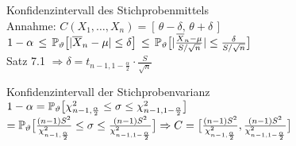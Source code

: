 \begin{example} Konfidenzintervall des Stichprobenmittels \\
	Annahme: \(C(X_1, \ldots, X_n) = [\, \theta - \delta, \, \theta + \delta \,]\) \\
	\(1 - \alpha
	\, \leq \, \P_\theta\big[\abs{\overline{X}_n - \mu} \leq \delta\big]
	\, \leq \, \P_\theta\big[\abs{ \frac{\overline{X}_n - \mu}{S/\sqrt{n}}} \leq \frac{\delta}{S/\sqrt{n}}\big]\) \\
	Satz 7.1 \( \Rightarrow \delta = t_{ n-1 , 1 - \frac{\alpha}{2} } \cdot \frac{S}{\sqrt{n}}\)
\end{example}

\begin{example} Konfidenzintervall der Stichprobenvarianz \\
	\(1 - \alpha
	= \P_\theta\big[ \chi_{n-1,\frac{\alpha}{2}}^2 \leq \sigma \leq \chi_{n-1,1 - \frac{\alpha}{2}}^2  \big]\) \\
	\(	= \P_\theta\big[ \frac{(n-1)S^2}{\chi_{n-1,\frac{\alpha}{2}}^2} \leq \sigma \leq \frac{(n-1)S^2}{\chi_{n-1,1 - \frac{\alpha}{2}}^2}  \big]
	\Rightarrow C =  \big[ \frac{(n-1)S^2}{\chi_{n-1,\frac{\alpha}{2}}^2}, \frac{(n-1)S^2}{\chi_{n-1,1 - \frac{\alpha}{2}}^2}  \big]\)

\end{example}



